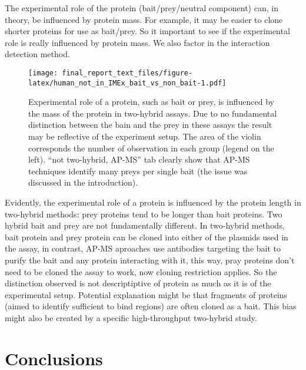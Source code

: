 \documentclass[12pt,]{report}
\begin{document}
The experimental role of the protein (bait/prey/neutral component) can,
in theory, be influenced by protein mass. For example, it may be easier
to clone shorter proteins for use as bait/prey. So it important to see
if the experimental role is really influenced by protein mass. We also
factor in the interaction detection method.

\begin{figure}
\centering
\texttt{[image: final\_report\_text\_files/figure-latex/human\_not\_in\_IMEx\_bait\_vs\_non\_bait-1.pdf]}
\caption{Experimental role of a protein, such as bait or prey, is
influenced by the mass of the protein in two-hybrid assays. Due to no
fundamental distinction between the bain and the prey in these assays
the result may be reflective of the experiment setup. The area of the
violin corresponds the number of observation in each group (legend on
the left). ``not two-hybrid, AP-MS'' tab clearly show that AP-MS
techniques identify many preys per single bait (the issue was discussed
in the introduction).}
\end{figure}

Evidently, the experimental role of a protein is influenced by the
protein length in two-hybrid methods: prey proteins tend to be longer
than bait proteins. Two hybrid bait and prey are not fundamentally
different. In two-hybrid methods, bait protein and prey protein can be
cloned into either of the plasmids used in the assay, in contrast, AP-MS
aproaches use antibodies targeting the bait to purify the bait and any
protein interacting with it, this way, pray proteins don't need to be
cloned the assay to work, now cloning restriction applies. So the
distinction observed is not descriptiptive of protein as much as it is
of the experimental setup. Potential explanation might be that fragments
of proteins (aimed to identify sufficient to bind regions) are often
cloned as a bait. This bias might also be created by a specific
high-throughput two-hybrid study.

\chapter{Conclusions}\label{conclusions}
\end{document}
